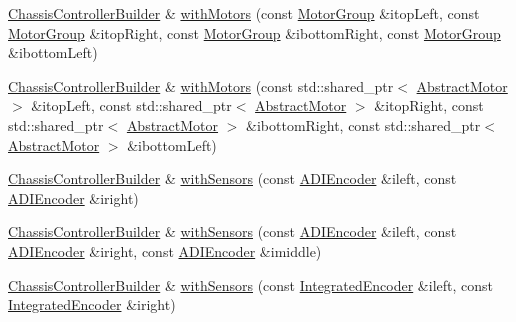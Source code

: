 \begin{DoxyCompactItemize}
\item 
\mbox{\hyperlink{classokapi_1_1ChassisControllerBuilder}{Chassis\+Controller\+Builder}} \& \mbox{\hyperlink{classokapi_1_1ChassisControllerBuilder_a5f8ddcfcd9c00fc205c1ec0536db3118}{with\+Motors}} (const \mbox{\hyperlink{classokapi_1_1MotorGroup}{Motor\+Group}} \&itop\+Left, const \mbox{\hyperlink{classokapi_1_1MotorGroup}{Motor\+Group}} \&itop\+Right, const \mbox{\hyperlink{classokapi_1_1MotorGroup}{Motor\+Group}} \&ibottom\+Right, const \mbox{\hyperlink{classokapi_1_1MotorGroup}{Motor\+Group}} \&ibottom\+Left)
\item 
\mbox{\hyperlink{classokapi_1_1ChassisControllerBuilder}{Chassis\+Controller\+Builder}} \& \mbox{\hyperlink{classokapi_1_1ChassisControllerBuilder_a423ebf033857cae3bfcf5542db6dffd2}{with\+Motors}} (const std\+::shared\+\_\+ptr$<$ \mbox{\hyperlink{classokapi_1_1AbstractMotor}{Abstract\+Motor}} $>$ \&itop\+Left, const std\+::shared\+\_\+ptr$<$ \mbox{\hyperlink{classokapi_1_1AbstractMotor}{Abstract\+Motor}} $>$ \&itop\+Right, const std\+::shared\+\_\+ptr$<$ \mbox{\hyperlink{classokapi_1_1AbstractMotor}{Abstract\+Motor}} $>$ \&ibottom\+Right, const std\+::shared\+\_\+ptr$<$ \mbox{\hyperlink{classokapi_1_1AbstractMotor}{Abstract\+Motor}} $>$ \&ibottom\+Left)
\item 
\mbox{\hyperlink{classokapi_1_1ChassisControllerBuilder}{Chassis\+Controller\+Builder}} \& \mbox{\hyperlink{classokapi_1_1ChassisControllerBuilder_a0197aa35c2c36dd82476bc70c5824a56}{with\+Sensors}} (const \mbox{\hyperlink{classokapi_1_1ADIEncoder}{A\+D\+I\+Encoder}} \&ileft, const \mbox{\hyperlink{classokapi_1_1ADIEncoder}{A\+D\+I\+Encoder}} \&iright)
\item 
\mbox{\hyperlink{classokapi_1_1ChassisControllerBuilder}{Chassis\+Controller\+Builder}} \& \mbox{\hyperlink{classokapi_1_1ChassisControllerBuilder_a5733a2198a3f10befcae5ee2a9a02d7e}{with\+Sensors}} (const \mbox{\hyperlink{classokapi_1_1ADIEncoder}{A\+D\+I\+Encoder}} \&ileft, const \mbox{\hyperlink{classokapi_1_1ADIEncoder}{A\+D\+I\+Encoder}} \&iright, const \mbox{\hyperlink{classokapi_1_1ADIEncoder}{A\+D\+I\+Encoder}} \&imiddle)
\item 
\mbox{\hyperlink{classokapi_1_1ChassisControllerBuilder}{Chassis\+Controller\+Builder}} \& \mbox{\hyperlink{classokapi_1_1ChassisControllerBuilder_adcc6c5e490cd2f51e319bd52f40b1d3f}{with\+Sensors}} (const \mbox{\hyperlink{classokapi_1_1IntegratedEncoder}{Integrated\+Encoder}} \&ileft, const \mbox{\hyperlink{classokapi_1_1IntegratedEncoder}{Integrated\+Encoder}} \&iright)
\item 

\end{DoxyCompactItemize}
